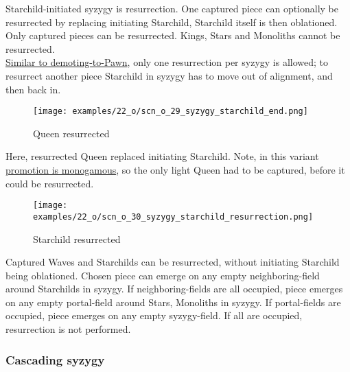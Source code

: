 Starchild-initiated syzygy is resurrection. One captured piece can optionally be resurrected by
replacing initiating Starchild, Starchild itself is then oblationed. Only captured pieces can be
resurrected. Kings, Stars and Monoliths cannot be resurrected. \\
\hyperref[fig:scn_d_18_syzygy_2_stars_steps]{Similar to demoting-to-Pawn}, only one resurrection per syzygy is
allowed; to resurrect another piece Starchild in syzygy has to move out of alignment, and then back in.

\clearpage %

\vspace*{-2.1\baselineskip}
\noindent
\begin{figure}[!h]
\texttt{[image: examples/22\_o/scn\_o\_29\_syzygy\_starchild\_end.png]}
\caption{Queen resurrected}
\label{fig:scn_o_29_syzygy_starchild_end}
\end{figure}

Here, resurrected Queen replaced initiating Starchild. Note, in this variant
\hyperref[sec:One/Promotion]{promotion is monogamous}, so the only light Queen
had to be captured, before it could be resurrected.

\clearpage %

\vspace*{-2.1\baselineskip}
\noindent
\begin{figure}[!h]
\texttt{[image: examples/22\_o/scn\_o\_30\_syzygy\_starchild\_resurrection.png]}
\caption{Starchild resurrected}
\label{fig:scn_o_30_syzygy_starchild_resurrection}
\end{figure}

Captured Waves and Starchilds can be resurrected, without initiating Starchild being oblationed. Chosen
piece can emerge on any empty neighboring-field around Starchilds in syzygy. If neighboring-fields are
all occupied, piece emerges on any empty portal-field around Stars, Monoliths in syzygy. If portal-fields
are occupied, piece emerges on any empty syzygy-field. If all are occupied, resurrection is not performed.

\clearpage %

\subsubsection*{Cascading syzygy}

